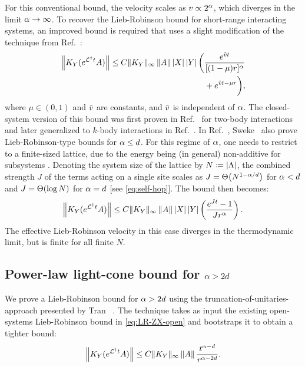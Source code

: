 For this conventional bound, the velocity scales as $v\propto 2^{\alpha} $, which diverges in the limit $\alpha \rightarrow \infty$.
To recover the Lieb-Robinson bound for short-range interacting systems, an improved bound is required that uses a slight modification of the technique from Ref.~\cite{Sweke2019}:
\begin{align}
  \begin{split}
  \left\|  K_Y(e^{\mathcal{L}^\dag t}A)\right\| \leq C \|K_Y\|_{\infty} \left\|A\right\|  \left | X \right|\left | Y \right|
    \biggl(&
    \frac{e^{\tilde vt}}{[(1-\mu)r]^{\alpha}}\\
    &+e^{\tilde vt-\mu r}
    \biggr),
  \end{split}\label{eq:LR-ZX-open}
\end{align}
where $\mu\in (0,1)$ and $\tilde v$ are constants, and $\tilde v$ is independent of $\alpha$.
The closed-system version of this bound was first proven in Ref.~\cite{Gong2014} for two-body interactions and later generalized to $k$-body interactions in Ref.~\cite{Tran2019b}.
In Ref.~\cite{Sweke2019}, Sweke \etal~also prove Lieb-Robinson-type bounds for $\alpha \le d$.
For this regime of $\alpha$, one needs to restrict to a finite-sized lattice, due to the energy being (in general) non-additive for subsystems \cite{Dauxois}.
Denoting the system size of the lattice by $N\coloneqq \left | \Lambda \right|$,
the combined strength $J$ of the terms acting on a single site  scales as $J = \Th{N^{1-\al/d}}$ for $\alpha < d$ and $J = \Th{\log{N}}$ for $\alpha = d$ [see \cref{eq:self-hop}].
The bound then becomes:
\begin{align}
\label{eq:LR-ZX-open-small-alpha}
    \left\|  K_Y(e^{\mathcal{L}^\dag t}A)\right\| \leq C \|K_Y\|_{\infty} \left\|A\right\|  \left | X \right|\left | Y \right|
  \left(
  \frac{e^{J t}-1}{J r^{\alpha}}
  \right).
\end{align}
The effective Lieb-Robinson velocity in this case diverges in the thermodynamic limit, but is finite for all finite $N$.


\subsection{Power-law light-cone bound for $\alpha > 2d$}
\label{sec:power-law-bound}

We prove a Lieb-Robinson bound  for $\alpha >2d$ using the truncation-of-unitaries-approach presented by Tran \etal~\cite{Tran2019b}.
The technique takes as input the existing open-systems Lieb-Robinson bound in \cref{eq:LR-ZX-open} and bootstraps it to obtain a tighter bound:
\begin{align}
  \left\|  K_Y(e^{\mathcal{L}^\dag t}A)\right\|
\leq C \|K_Y\|_{\infty}\left\|A\right\| \frac{t^{\alpha-d}}{r^{\alpha-2d}}.
    \label{eq:LR-Minh-constX}
\end{align}

